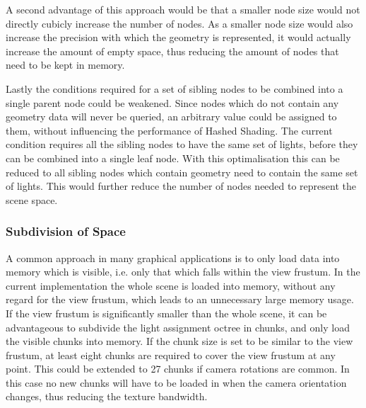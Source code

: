 A second advantage of this approach would be that a smaller node size would not directly
cubicly increase the number of nodes. As a smaller node size would also increase the
precision with which the geometry is represented, it would actually increase the amount of
empty space, thus reducing the amount of nodes that need to be kept in memory.

Lastly the conditions required for a set of sibling nodes to be combined into a single
parent node could be weakened. Since nodes which do not contain any geometry data will
never be queried, an arbitrary value could be assigned to them, without influencing the
performance of Hashed Shading. The current condition requires all the sibling nodes to
have the same set of lights, before they can be combined into a single leaf node. With
this optimalisation this can be reduced to all sibling nodes which contain geometry
need to contain the same set of lights. This would further reduce the number of nodes
needed to represent the scene space.

\subsubsection{Subdivision of Space}



A common approach in many graphical applications is to only load data into memory which
is visible, i.e. only that which falls within the view frustum. In the current implementation
the whole scene is loaded into memory, without any regard for the view frustum, which leads
to an unnecessary large memory usage. If the view frustum is significantly smaller than the
whole scene, it can be advantageous to subdivide the light assignment octree in chunks, and
only load the visible chunks into memory. If the chunk size is set to be similar to the view
frustum, at least eight chunks are required to cover the view frustum at any point.
This could be extended to 27 chunks if camera rotations are common. In this case no new chunks
will have to be loaded in when the camera orientation changes, thus reducing the texture
bandwidth.

